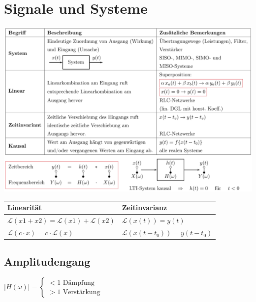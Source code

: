 \section{Signale und Systeme}
	
	\includegraphics[width=\textwidth]{./bilder/LTISystem.png}\\

	\begin{tabular}{|l|l|}
    	\hline
    	\textbf{Linearität} & \textbf{Zeitinvarianz}\\
    	\hline
    	$\mathcal{L}(x1+x2)=\mathcal{L}(x1)+\mathcal{L}(x2)$ & $\mathcal{L}(x(t)) = y(t)$ \\
    	$\mathcal{L}(c\cdot x)=c\cdot \mathcal{L}(x)$ & $\mathcal{L}(x(t-t_0)) = y(t-t_0)$ \\
		\hline    
    \end{tabular}
  	
	\subsection{Amplitudengang}
		$|H(\omega)| = \begin{cases}
			< 1 \text{ Dämpfung} \\
			> 1 \text{ Verstärkung}
		\end{cases}$
		
		
